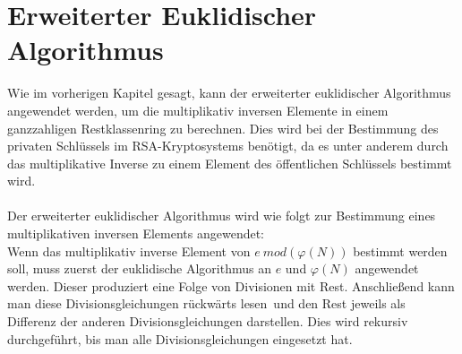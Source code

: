 \section{Erweiterter Euklidischer Algorithmus}
\label{sec:Erweitert_Euklid}
Wie im vorherigen Kapitel gesagt, kann der erweiterter euklidischer Algorithmus angewendet werden, um die multiplikativ inversen Elemente in einem ganzzahligen Restklassenring zu berechnen. Dies wird bei der Bestimmung des privaten Schlüssels im RSA-Kryptosystems benötigt, da es unter anderem durch das multiplikative Inverse zu einem Element des öffentlichen Schlüssels bestimmt wird.\\
\\
Der erweiterter euklidischer Algorithmus wird wie folgt zur Bestimmung eines multiplikativen inversen Elements angewendet:\\
Wenn das multiplikativ inverse Element von $e~mod (\varphi(N))$ bestimmt werden soll, muss zuerst der euklidische Algorithmus an $e$ und $\varphi(N)$ angewendet werden. Dieser produziert eine Folge von Divisionen mit Rest. Anschließend kann man diese Divisionsgleichungen \glqq rückwärts lesen\grqq~und den Rest jeweils als Differenz der anderen Divisionsgleichungen darstellen. Dies wird rekursiv durchgeführt, bis man alle Divisionsgleichungen eingesetzt hat.\\
\\
